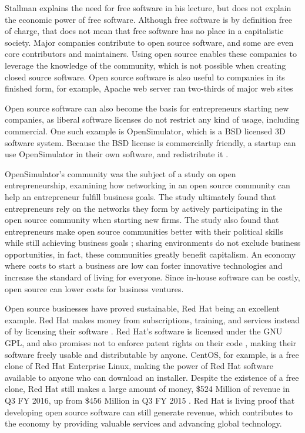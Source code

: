 ﻿Stallman \citeyear{rms2011} explains the need for free software in his lecture, but does not explain the economic power of free software.
Although free software is by definition free of charge, that does not mean that free software has no place in a capitalistic society.
Major companies contribute to open source software, and some are even core contributors and maintainers.
Using open source enables these companies to leverage the knowledge of the community, which is not possible when creating closed source software.
Open source software is also useful to companies in its finished form, for example, Apache web server ran two-thirds of major web sites \cite[p.~696]{powell}

Open source software can also become the basis for entrepreneurs starting new companies, as liberal software licenses do not restrict any kind of usage, including commercial.
One such example is OpenSimulator, which is a BSD licensed 3D software system.
Because the BSD license is commercially friendly, a startup can use OpenSimulator in their own software, and redistribute it \cite[p.~477-8]{yetis}.

OpenSimulator's community was the subject of a study on open entrepreneurship, examining how networking in an open source community can help an entrepreneur fulfill business goals.
The study ultimately found that entrepreneurs rely on the networks they form by actively participating in the open source community when starting new firms.
The study also found that entrepreneurs make open source communities better with their political skills while still achieving business goals \cite{yetis}; sharing environments do not exclude business opportunities, in fact, these communities greatly benefit capitalism.
An economy where costs to start a business are low can foster innovative technologies and increase the standard of living for everyone. Since in-house software can be costly, open source can lower costs for business ventures.

Open source businesses have proved sustainable, Red Hat being an excellent example.
Red Hat makes money from subscriptions, training, and services instead of by licensing their software \cite[p.~31]{redhat}.
Red Hat's software is licensed under the GNU GPL, and also promises not to enforce patent rights on their code \cite[p.~65]{redhat}, making their software freely usable and distributable by anyone.
CentOS, for example, is a free clone of Red Hat Enterprise Linux, making the power of Red Hat software available to anyone who can download an installer.
Despite the existence of a free clone, Red Hat still makes a large amount of money, \$524 Million of revenue in Q3 FY 2016, up from \$456 Million in Q3 FY 2015 \cite[p.~24]{redhat}.
Red Hat is living proof that developing open source software can still generate revenue, which contributes to the economy by providing valuable services and advancing global technology.

